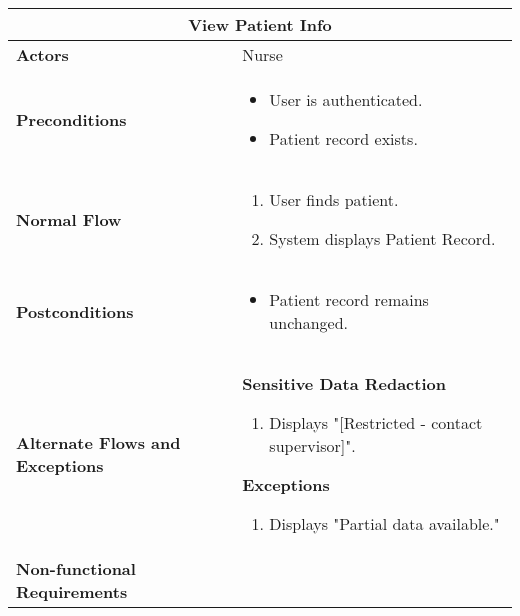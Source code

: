\documentclass{article}
\begin{document}
\renewcommand{\arraystretch}{1.3} %

\begin{longtable}{| p{5cm} | p{10cm} |}
    \hline
    \multicolumn{2}{|c|}{\textbf{View Patient Info}} \\
    \hline
    \textbf{Actors} & Nurse \\
    \hline
    \textbf{Preconditions} & 
    \begin{itemize}
        \item User is authenticated.
        \item Patient record exists.
    \end{itemize} \\
    \hline
    \textbf{Normal Flow} & 
    \begin{enumerate}
        \item User finds patient.
        \item System displays Patient Record.
    \end{enumerate} \\
    \hline
    \textbf{Postconditions} & 
    \begin{itemize}
        \item Patient record remains unchanged.
    \end{itemize} \\
    \hline
    \textbf{Alternate Flows and Exceptions} & 
    \textbf{Sensitive Data Redaction}  
    \begin{enumerate}
        \item Displays "[Restricted - contact supervisor]".
    \end{enumerate}

    \textbf{Exceptions}  
    \begin{enumerate}
        \item Displays "Partial data available."
    \end{enumerate} \\
    \hline
    \textbf{Non-functional Requirements} &  \\
    \hline
\end{longtable}


\renewcommand{\arraystretch}{1.3} %
\end{document}
